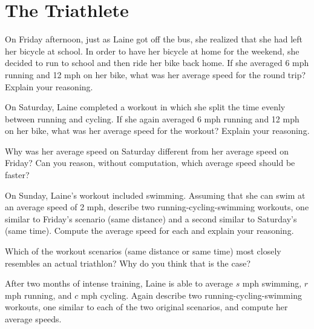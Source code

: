 \newpage
\section{The Triathlete}\label{A:Triathlete}

\begin{prob} 
On Friday afternoon, just as Laine got off the bus, she realized that she had left her bicycle at school.  In order to have her bicycle at home for the weekend, she decided to run to school and then ride her bike back home.  If she averaged 6 mph running and 12 mph on her bike, what was her average speed for the round trip?  Explain your reasoning. 
\end{prob}
\begin{prob}
On Saturday, Laine completed a workout in which she split the time evenly between running and cycling.  If she again averaged 6 mph running and 12 mph on her bike, what was her average speed for the workout?  Explain your reasoning. 
\end{prob}
\begin{prob}
Why was her average speed on Saturday different from her average speed on Friday?  Can you reason, without computation, which average speed should be faster?  
\end{prob}
\begin{prob} On Sunday, Laine's workout included swimming.  Assuming that she can swim at an average speed of 2 mph, describe two running-cycling-swimming workouts, one similar to Friday's scenario (same distance) and a second similar to Saturday's (same time).  Compute the average speed for each and explain your reasoning.  
\end{prob}
\begin{prob}
Which of the workout scenarios (same distance or same time) most closely resembles an actual triathlon?  Why do you think that is the case?
\end{prob}
\begin{prob}
After two months of intense training, Laine is able to average $s$ mph swimming, $r$ mph running, and $c$ mph cycling.  Again describe two running-cycling-swimming workouts, one similar to each of the two original scenarios, and compute her average speeds.     
\end{prob}
